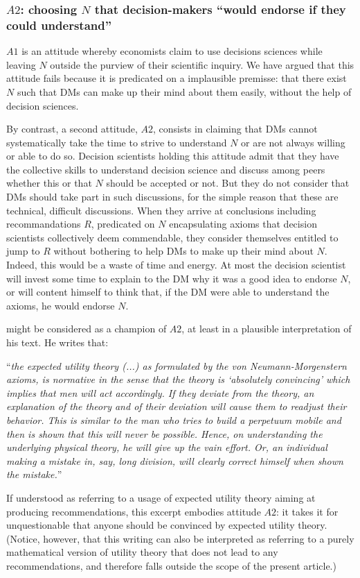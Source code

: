 \documentclass[preprint, french, english, 11pt, authoryear]{elsarticle}%
\newcommand{\protectforpdf}[1]{\texorpdfstring{\ensuremath{#1}}{#1}}
\begin{document}
\subsubsection{\protectforpdf{A2}: choosing \protectforpdf{N} that decision-makers “would endorse if they could understand”}
$A1$ is an attitude whereby economists claim to use decisions sciences while leaving $N$ outside the purview of their scientific inquiry. We have argued that this attitude fails because it is predicated on a implausible premisse: that there exist $N$ such that \acp{DM} can make up their mind about them easily, without the help of decision sciences. 

By contrast, a second attitude, $A2$, consists in claiming that \acp{DM} cannot systematically take the time to strive to understand $N$ or are not always willing or able to do so. Decision scientists holding this attitude admit that they have the collective skills to understand decision science and discuss among peers whether this or that $N$ should be accepted or not. But they do not consider that \acp{DM} should take part in such discussions, for the simple reason that these are technical, difficult discussions. When they arrive at conclusions including recommandations $R$, predicated on $N$ encapsulating axioms that decision scientists collectively deem commendable, they consider themselves entitled to jump to $R$ without bothering to help \acp{DM} to make up their mind about $N$. Indeed, this would be a waste of time and energy. At most the decision scientist will invest some time to explain to the \ac{DM} why it was a good idea to endorse $N$, or will content himself to think that, if the \ac{DM} were able to understand the axioms, he would endorse $N$.

\citet[p. 180]{morgenstern_reflections_1979} might be considered as a champion of $A2$, at least in a plausible interpretation of his text. He writes that: 

\begin{addmargin}[3em]{3em}
“\emph{the expected utility theory (...) as formulated by the von Neumann-Morgenstern axioms, is normative in the sense that the theory is ‘absolutely convincing’ which implies that men will act accordingly. If they deviate from the theory, an explanation of the theory and of their deviation will cause them to readjust their behavior. This is similar to the man who tries to build a perpetuum mobile and then is shown that this will never be possible. Hence, on understanding the underlying physical theory, he will give up the vain effort. Or, an individual making a mistake in, say, long division, will clearly correct himself when shown the mistake.}” 
\end{addmargin}
If understood as referring to a usage of expected utility theory aiming at producing recommendations, this excerpt embodies attitude $A2$: it takes it for unquestionable that anyone should be convinced by expected utility theory. (Notice, however, that this writing can also be interpreted as referring to a purely mathematical version of utility theory that does not lead to any recommendations, and therefore falls outside the scope of the present article.)
\end{document}

